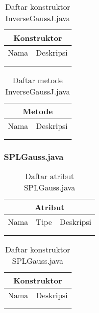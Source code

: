 \begin{table}[H]
    \centering
    \begin{tabular}{c|c}
        \hline
        \hline
        \multicolumn{2}{c}{\textbf{Konstruktor}}\\
        \hline
        \hline
         Nama  & Deskripsi \\
         \hline 
         \hline 
         &  \\
         &  \\
    \end{tabular}
    \caption{Daftar konstruktor InverseGaussJ.java}
\end{table}

\begin{table}[H]
    \centering
    \begin{tabular}{c|c}
        \hline
        \hline
        \multicolumn{2}{c}{\textbf{Metode}}\\
        \hline
        \hline
         Nama  & Deskripsi \\
         \hline 
         \hline 
         &  \\
         &  \\
    \end{tabular}
    \caption{Daftar metode InverseGaussJ.java}
\end{table}

\subsubsection{SPLGauss.java}

\begin{table}[H]
    \centering
    \begin{tabular}{c|c|c}
        \hline
        \hline
        \multicolumn{3}{c}{\textbf{Atribut}}\\
        \hline
        \hline
         Nama & Tipe & Deskripsi \\
         \hline 
         \hline 
         &  & \\
         &  & \\
    \end{tabular}
    \caption{Daftar atribut SPLGauss.java}
\end{table}

\begin{table}[H]
    \centering
    \begin{tabular}{c|c}
        \hline
        \hline
        \multicolumn{2}{c}{\textbf{Konstruktor}}\\
        \hline
        \hline
         Nama  & Deskripsi \\
         \hline 
         \hline 
         &  \\
         &  \\
    \end{tabular}
    \caption{Daftar konstruktor SPLGauss.java}
\end{table}


